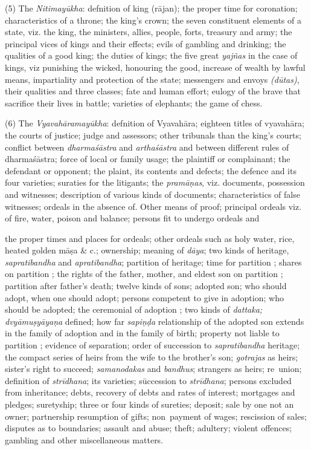 \documentclass[11pt, openany]{book}
\begin{document}
(5) The \emph{\en Nitimayūkha}: defnition of king (rājan); the proper time for coronation; characteristics of a throne; the king's crown; the seven constituent elements of a state, viz. the king, the ministers, allies, people, forts, treasury and army; the principal vices of kings and their effects; evils of gambling and drinking; the qualities of a good king; the duties of kings; the five great \emph{\en yajñas} in the case of kings, viz punishing the wicked, honouring the good, increase of wealth by lawful means, impartiality and protection of the state; messengers and envoys \emph{\en (dūtas)}, their qualities and three classes; fate and human effort; eulogy of the brave that sacrifice their lives in battle; varieties of elephants; the game of chess.

(6) The \emph{\en Vyavahāramayūkha}: defnition of Vyavahāra; eighteen titles of vyavahāra; the courts of justice; judge and assessors; other tribunals than the king's courts; conflict between \emph{\en dharmaśāstra} and \emph{\en arthaśāstra} and between different rules of dharmaśāstra; force of local or family usage; the plaintiff or complainant; the defendant or opponent; the plaint, its contents and defects; the defence and its four varieties; suraties for the litigants; the \emph{\en pramāṇas}, viz. documents, possession and witnesses; description of various kinds of documents; characteristics of false witnesses; ordeals in the absence of. Other means of proof; principal ordeals viz. of fire, water, poison and balance; persons fit to undergo ordeals and

\newpage

\noindent
the proper times and places for ordeals; other ordeals such as holy water, rice, heated golden māṣa \& c.; ownership; meaning of \emph{\en dāya}; two kinds of heritage, \emph{\en sapratibandha} and \emph{\en apratibandha}; partition of heritage; time for partition ; shares on partition ; the rights of the father, mother, and eldest son on partition ; partition after father's death; twelve kinds of sons; adopted son; who should adopt, when one should adopt; persons competent to give in adoption; who should be adopted; the ceremonial of adoption ; two kinds of \emph{\en dattaka; dvyāmuṣyāyaṇa} defined; how far \emph{\en sapiṇḍa} relationship of the adopted son extends in the family of adoption and in the family of birth; property not liable to partition ; evidence of separation; order of succession to \emph{\en sapratibandha} heritage; the compact series of heirs from the wife to the brother's son; \emph{\en gotrajas} as heirs; sister's right to succeed; \emph{\en samanodakas} and \emph{\en bandhus}; strangers as heirs; re\textendash\ union; definition of \emph{\en strīdhana}; its varieties; sūccession to \emph{\en strīdhana}; persons excluded from inheritance; debts, recovery of debts and rates of interest; mortgages and pledges; suretyship; three or four kinds of sureties; deposit; sale by one not an owner; partnership resumption of gifts; non\textendash\ payment of wages; rescission of sales; disputes as to boundaries; assault and abuse; theft; adultery; violent offences; gambling and other miscellaneous matters.
\end{document}
